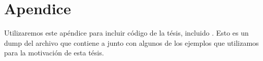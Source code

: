 \chapter{Apendice}\label{ch:apendice}

Utilizaremos este apéndice para incluir código de la tésis, incluido \lift.
Esto es un dump del archivo que contiene a \lift junto con algunos de los ejemplos que utilizamos para la motivación de esta tésis.

